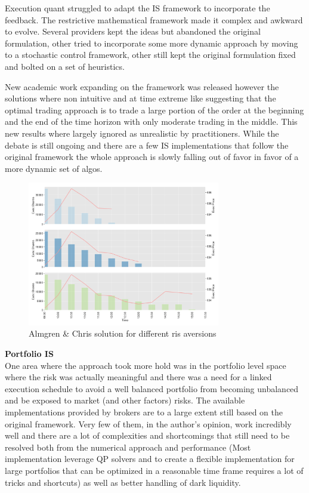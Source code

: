 Execution quant struggled to adapt the IS framework to incorporate the feedback. The restrictive mathematical framework made it complex and awkward to evolve. Several providers kept the ideas but abandoned the original formulation, other tried to incorporate some more dynamic approach by moving to a stochastic control framework, other still kept the original formulation fixed and bolted on a set of heuristics.

New academic work expanding on the framework was released however the solutions where non intuitive and at time extreme like suggesting that the optimal trading approach is to trade a large portion of the order at the beginning and the end of the time horizon with only moderate trading in the middle. This new results where largely ignored as unrealistic by practitioners. While the debate is still ongoing and there are a few IS implementations that follow the original framework the whole approach is slowly falling out of favor in favor of a more dynamic set of algos. \\

	\begin{figure}[!ht]
	\centering
	\includegraphics[width=0.75\textwidth]{chapters/chapter_exec_models/figures/is.png} 
	\caption{Almgren \& Chris solution for different ris aversions \label{fig:is}}
	\end{figure}

\noindent\textbf{Portfolio IS} \\

One area where the approach took more hold was in the portfolio level space where the risk was actually meaningful and there was a need for a linked execution schedule to avoid a well balanced portfolio from becoming unbalanced and be exposed to market (and other factors) risks. The available implementations provided by brokers are to a large extent still based on the original framework. Very few of them, in the author's opinion, work incredibly well and there are a lot of complexities and shortcomings that still need to be resolved both from the numerical approach and performance (Most implementation leverage QP solvers and to create a flexible implementation for large portfolios that can be optimized in a reasonable time frame requires a lot of tricks and shortcuts) as well as better handling of dark liquidity. \\


